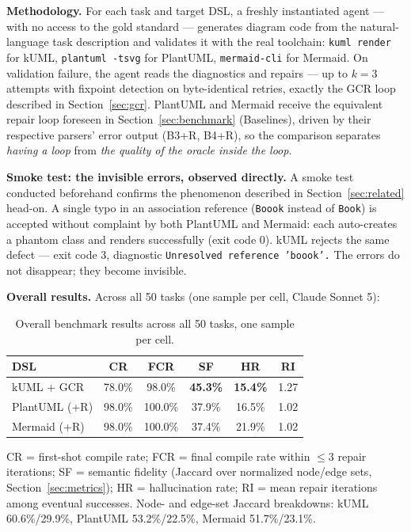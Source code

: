 \documentclass[acmsmall,nonacm]{acmart}
\begin{document}
\textbf{Methodology.} For each task and target DSL, a freshly instantiated agent --- with no access to the gold standard --- generates diagram code from the natural-language task description and validates it with the real toolchain: \texttt{kuml render} for kUML, \texttt{plantuml -tsvg} for PlantUML, \texttt{mermaid-cli} for Mermaid. On validation failure, the agent reads the diagnostics and repairs --- up to $k = 3$ attempts with fixpoint detection on byte-identical retries, exactly the GCR loop described in Section~\ref{sec:gcr}. PlantUML and Mermaid receive the equivalent repair loop foreseen in Section~\ref{sec:benchmark} (Baselines), driven by their respective parsers' error output (B3+R, B4+R), so the comparison separates \emph{having a loop} from \emph{the quality of the oracle inside the loop}.

\textbf{Smoke test: the invisible errors, observed directly.} A smoke test conducted beforehand confirms the phenomenon described in Section~\ref{sec:related} head-on. A single typo in an association reference (\texttt{Boook} instead of \texttt{Book}) is accepted without complaint by both PlantUML and Mermaid: each auto-creates a phantom class and renders successfully (exit code 0). kUML rejects the same defect --- exit code 3, diagnostic \texttt{Unresolved reference 'boook'.} The errors do not disappear; they become invisible.

\textbf{Overall results.} Across all 50 tasks (one sample per cell, Claude Sonnet 5):

\begin{table}[h]
\caption{Overall benchmark results across all 50 tasks, one sample per cell.}
\label{tab:overall}
\begin{tabular}{@{}lccccc@{}}
\toprule
DSL & CR & FCR & SF & HR & RI \\
\midrule
kUML + GCR     & 78.0\% & 98.0\%  & \textbf{45.3\%} & \textbf{15.4\%} & 1.27 \\
PlantUML (+R)  & 98.0\% & 100.0\% & 37.9\% & 16.5\% & 1.02 \\
Mermaid (+R)   & 98.0\% & 100.0\% & 37.4\% & 21.9\% & 1.02 \\
\bottomrule
\end{tabular}
\end{table}

CR = first-shot compile rate; FCR = final compile rate within $\leq 3$ repair iterations; SF = semantic fidelity (Jaccard over normalized node/edge sets, Section~\ref{sec:metrics}); HR = hallucination rate; RI = mean repair iterations among eventual successes. Node- and edge-set Jaccard breakdowns: kUML 60.6\%/29.9\%, PlantUML 53.2\%/22.5\%, Mermaid 51.7\%/23.1\%.
\end{document}
